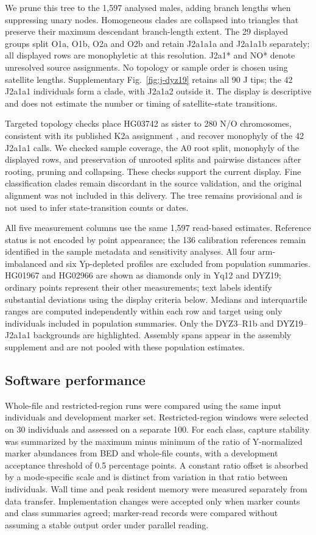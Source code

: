 \documentclass[pdflatex,sn-nature]{sn-jnl}
\begin{document}
We prune this tree to the 1,597 analysed males, adding branch lengths when suppressing unary nodes. Homogeneous clades are collapsed into triangles that preserve their maximum descendant branch-length extent. The 29 displayed groups split O1a, O1b, O2a and O2b and retain J2a1a1a and J2a1a1b separately; all displayed rows are monophyletic at this resolution. J2a1* and NO* denote unresolved source assignments. No topology or sample order is chosen using satellite lengths. Supplementary Fig.~\ref{fig:j-dyz19} retains all 90 J tips; the 42 J2a1a1 individuals form a clade, with J2a1a2 outside it. The display is descriptive and does not estimate the number or timing of satellite-state transitions.

Targeted topology checks place HG03742 as sister to 280 N/O chromosomes, consistent with its published K2a assignment \cite{Poznik2016}, and recover monophyly of the 42 J2a1a1 calls. We checked sample coverage, the A0 root split, monophyly of the displayed rows, and preservation of unrooted splits and pairwise distances after rooting, pruning and collapsing. These checks support the current display. Fine classification clades remain discordant in the source validation, and the original alignment was not included in this delivery. The tree remains provisional and is not used to infer state-transition counts or dates.

All five measurement columns use the same 1,597 read-based estimates. Reference status is not encoded by point appearance; the 136 calibration references remain identified in the sample metadata and sensitivity analyses. All four arm-imbalanced and six Yp-depleted profiles are excluded from population summaries. HG01967 and HG02966 are shown as diamonds only in Yq12 and DYZ19; ordinary points represent their other measurements; text labels identify substantial deviations using the display criteria below. Medians and interquartile ranges are computed independently within each row and target using only individuals included in population summaries. Only the DYZ3--R1b and DYZ19--J2a1a1 backgrounds are highlighted. Assembly spans appear in the assembly supplement and are not pooled with these population estimates.

\subsection{Software performance}\label{sec:m-performance}
Whole-file and restricted-region runs were compared using the same input individuals and development marker set. Restricted-region windows were selected on 30 individuals and assessed on a separate 100. For each class, capture stability was summarized by the maximum minus minimum of the ratio of Y-normalized marker abundances from BED and whole-file counts, with a development acceptance threshold of 0.5 percentage points. A constant ratio offset is absorbed by a mode-specific scale and is distinct from variation in that ratio between individuals. Wall time and peak resident memory were measured separately from data transfer. Implementation changes were accepted only when marker counts and class summaries agreed; marker-read records were compared without assuming a stable output order under parallel reading.
\end{document}
